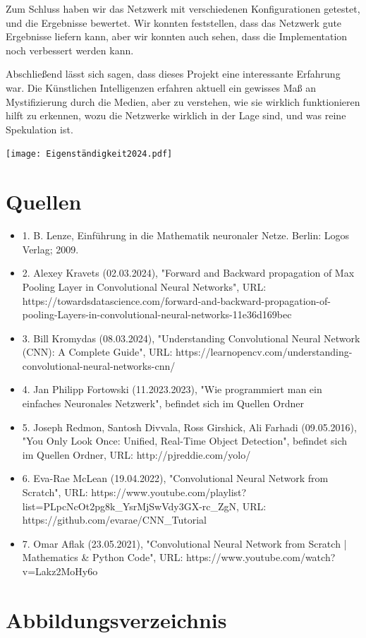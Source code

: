 \documentclass[12pt]{article}
\begin{document}
Zum Schluss haben wir das Netzwerk mit verschiedenen Konfigurationen getestet, und die Ergebnisse bewertet. Wir konnten feststellen, dass das Netzwerk gute Ergebnisse liefern kann, aber wir konnten auch sehen, dass die Implementation noch verbessert werden kann.

Abschließend lässt sich sagen, dass dieses Projekt eine interessante Erfahrung war. Die Künstlichen Intelligenzen erfahren aktuell ein gewisses Maß an Mystifizierung durch die Medien, aber zu verstehen, wie sie wirklich funktionieren hilft zu erkennen, wozu die Netzwerke wirklich in der Lage sind, und was reine Spekulation ist. 

\cleardoublepage
\thispagestyle{empty}
\texttt{[image: Eigenständigkeit2024.pdf]}

\cleardoublepage
\sloppy
\section{Quellen}
\begin{itemize}
\item 1. B. Lenze, Einführung in die Mathematik neuronaler Netze. Berlin: Logos Verlag; 2009.
\item 2. Alexey Kravets (02.03.2024), "Forward and Backward propagation of Max Pooling Layer in Convolutional Neural Networks", URL: https://towardsdatascience.com/forward-and-backward-propagation-of-pooling-Layers-in-convolutional-neural-networks-11e36d169bec
\item 3. Bill Kromydas (08.03.2024), "Understanding Convolutional Neural Network (CNN): A Complete Guide", URL: https://learnopencv.com/understanding-convolutional-neural-networks-cnn/
\item 4. Jan Philipp Fortowski (11.2023.2023), "Wie programmiert man ein einfaches Neuronales Netzwerk", befindet sich im Quellen Ordner
\item 5. Joseph Redmon, Santosh Divvala, Ross Girshick, Ali Farhadi (09.05.2016), "You Only Look Once:
Unified, Real-Time Object Detection", befindet sich im Quellen Ordner, URL: http://pjreddie.com/yolo/
\item 6. Eva-Rae McLean (19.04.2022), "Convolutional Neural Network from Scratch", URL: https://www.youtube.com/playlist?list=PLpcNcOt2pg8k\_YsrMjSwVdy3GX-rc\_ZgN, URL: https://github.com/evarae/CNN\_Tutorial
\item 7. Omar Aflak (23.05.2021), "Convolutional Neural Network from Scratch | Mathematics \& Python Code", URL: https://www.youtube.com/watch?v=Lakz2MoHy6o


\end{itemize}

\cleardoublepage
\section{Abbildungsverzeichnis}
\listoffigures
\end{document}

